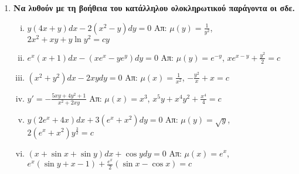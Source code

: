 \begin{enumerate}
  \item {\bfseries Να λυθούν με τη βοήθεια του κατάλληλου ολοκληρωτικού 
    παράγοντα οι σδε.}
    \begin{enumerate}[i)]
      \item $ y(4x+y)dx-2(x^{2}-y)dy=0 $ 
        \hfill Απ: $ \mu(y)= \frac{1}{y^{2}} $, $ 2x^{2}+xy+ y \ln{y^{2}} =cy$ 
      \item $ e^{x}(x+1)dx - (xe^{x}-ye^{y})dy = 0 $ 
        \hfill Απ: $ \mu(y) = e^{-y} $, $xe^{x-y} + \frac{y^{2}}{2} = c $
      \item $ (x^{2}+y^{2})dx - 2xydy = 0 $ 
        \hfill Απ: $ \mu(x)= \frac{1}{x^{2}} $, $ - \frac{y^{2}}{x} + x = c $
      \item $ y' =- \frac{5xy+4y^{2}+1}{x^{2}+2xy} $ 
        \hfill Απ: $ \mu(x)=x^{3} $, $ x^{5}y+x^{4}y^{2} + \frac{x^{4}}{4} = c $ 
      \item $ y(2e^{x}+4x)dx + 3(e^{x}+x^{2})dy = 0 $ 
        \hfill Απ: $ \mu(y)= \sqrt{ y } $, $ 2(e^{x}+x^{2})y^{\frac{3}{2}}=c $ 
      \item $ (x + \sin{x} + \sin{y})dx + \cos{y} dy =0 $ 
        \hfill Απ: $\mu(x)=e^{x} $, $ e^x(\sin{y} + x-1) + \frac{e^{x}}{2} 
        (\sin{x} - \cos{x})=c $
    \end{enumerate}
      \end{enumerate}

        
